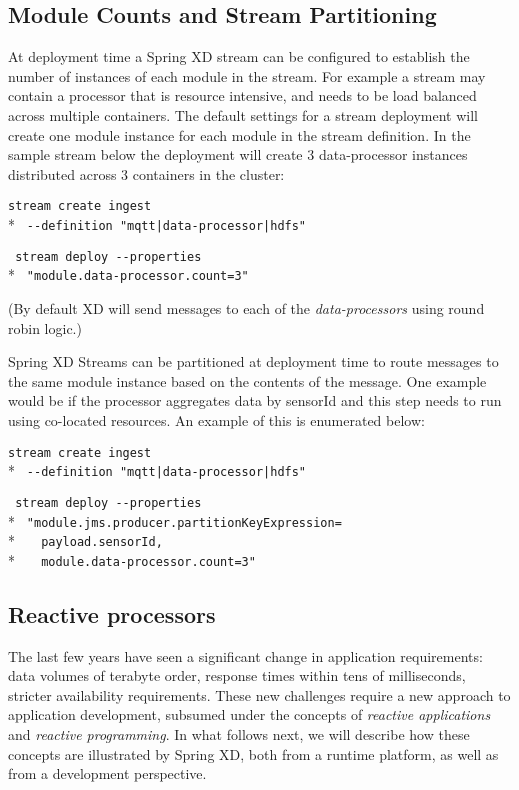 \subsection {Module Counts and Stream Partitioning}
At deployment time a Spring XD stream can be configured to establish the number
of instances of each module in the stream. For example a stream may contain
a processor that is resource intensive, and needs to be
load balanced across multiple containers. The default
settings for a stream deployment will create one module instance for each
module in the stream definition. In the sample stream below the
deployment will create 3 data-processor instances distributed
across 3 containers in the cluster:

\verb;stream create ingest;\\*
\verb; --definition "mqtt|data-processor|hdfs" ;

\verb; stream deploy --properties;\\*
\verb; "module.data-processor.count=3";

(By default XD will send messages to each of the \emph{data-processors}
using round robin logic.)

Spring XD Streams can be partitioned at deployment time to route messages to the
same module instance based on the contents of the message. One example
would be if the processor aggregates data by sensorId and this step needs to
run using co-located resources.  An example of this is enumerated below:

\verb;stream create ingest;\\*
\verb; --definition "mqtt|data-processor|hdfs" ;

\verb; stream deploy --properties;\\*
\verb; "module.jms.producer.partitionKeyExpression=;\\*
\verb;   payload.sensorId,;\\*
\verb;   module.data-processor.count=3";


\subsection {Reactive processors}

The last few years have seen a significant change in application requirements:
data volumes of terabyte order, response times within tens of milliseconds, stricter
availability requirements. These new challenges require a new approach to application
development, subsumed under the concepts of \emph{reactive applications} and \emph{reactive
programming}. In what follows next, we will describe how these concepts are
illustrated by Spring XD, both from a runtime platform, as well as from a development perspective.

